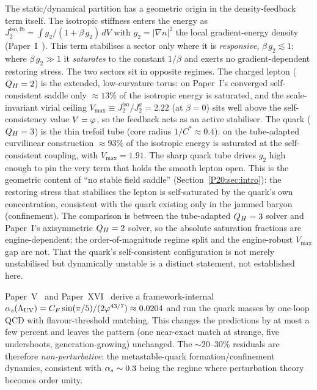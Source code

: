 \begin{remark}
\label{P20:rem:feedback_saturation}
The static/dynamical partition has a geometric origin in the
density-feedback term itself. The isotropic stiffness enters the energy
as $J_2^{\mathrm{iso,fb}}=\int g_2/(1+\beta\,g_2)\,dV$ with
$g_2=|\nabla n|^2$ the local gradient-energy density (Paper~I~\cite{Paper1}).
This term stabilises a sector only where it is \emph{responsive},
$\beta\,g_2\lesssim1$; where $\beta\,g_2\gg1$ it \emph{saturates} to the
constant $1/\beta$ and exerts no gradient-dependent restoring stress. The
two sectors sit in opposite regimes. The charged lepton ($Q_H=2$) is the
extended, low-curvature torus: on Paper~I's converged self-consistent
saddle only $\approx13\%$ of the isotropic energy is saturated, and the
scale-invariant virial ceiling
$V_{\max}\equiv J_2^{\mathrm{iso}}/J_2^{a}=2.22$ (at $\beta=0$) sits well
above the self-consistency value $V=\varphi$, so the feedback acts as an
active stabiliser. The quark ($Q_H=3$) is the thin trefoil tube (core
radius $1/C^\ast\!\approx\!0.4$): on the tube-adapted curvilinear
construction $\approx93\%$ of the isotropic energy is saturated at the
self-consistent coupling, with $V_{\max}=1.91$. The sharp quark tube
drives $g_2$ high enough to pin the very term that holds the smooth
lepton open. This is the geometric content of ``no stable field saddle''
(Section~\ref{P20:sec:intro}): the restoring stress that stabilises the
lepton is self-saturated by the quark's own concentration, consistent
with the quark existing only in the jammed baryon (confinement). The
comparison is between the tube-adapted $Q_H=3$ solver and Paper~I's
axisymmetric $Q_H=2$ solver, so the absolute saturation fractions are
engine-dependent; the order-of-magnitude regime split and the
engine-robust $V_{\max}$ gap are not. That the quark's self-consistent
configuration is not merely unstabilised but dynamically unstable is a
distinct statement, not established here.
\end{remark}

\begin{remark}
\label{P20:rem:perturbative}
Paper~V~\cite{Paper5} and Paper~XVI~\cite{Paper16} derive a
framework-internal $\alpha_s(\Lambda_{\rm UV})=C_F\sin(\pi/5)/(2\varphi^{43/7})
\approx0.0204$ and run the quark masses by one-loop QCD with
flavour-threshold matching. This changes the predictions by at most a few
percent and leaves the pattern (one near-exact match at strange, five
undershoots, generation-growing) unchanged. The $\sim20$--$30\%$
residuals are therefore \emph{non-perturbative}: the metastable-quark
formation/confinement dynamics, consistent with $\alpha_s\sim0.3$ being
the regime where perturbation theory becomes order unity.
\end{remark}

